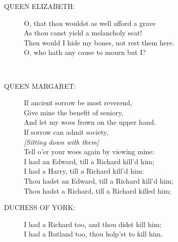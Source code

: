 \documentclass{article}
\begin{document}
\begin{description}
\item[QUEEN ELIZABETH:] 
\hspace{1pt}O, that thou wouldst as well afford a grave\\
\hspace{1pt}As thou canst yield a melancholy seat!\\
\hspace{1pt}Then would I hide my bones, not rest them here.\\
\hspace{1pt}O, who hath any cause to mourn but I?\\
\end{description}
\\
\begin{description}
\item[QUEEN MARGARET:] 
\hspace{1pt}If ancient sorrow be most reverend,\\
\hspace{1pt}Give mine the benefit of seniory,\\
\hspace{1pt}And let my woes frown on the upper hand.\\
\hspace{1pt}If sorrow can admit society,\\
{\it [Sitting down with them]}\\
\hspace{1pt}Tell o'er your woes again by viewing mine:\\
\hspace{1pt}I had an Edward, till a Richard kill'd him;\\
\hspace{1pt}I had a Harry, till a Richard kill'd him:\\
\hspace{1pt}Thou hadst an Edward, till a Richard kill'd him;\\
\hspace{1pt}Thou hadst a Richard, till a Richard killed him;\\
\end{description}
\begin{description}
\item[DUCHESS OF YORK:] 
\hspace{1pt}I had a Richard too, and thou didst kill him;\\
\hspace{1pt}I had a Rutland too, thou holp'st to kill him.\\
\end{description}
\end{document}
